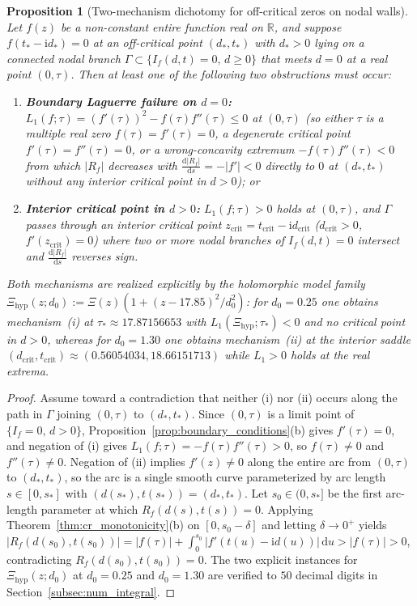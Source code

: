 \documentclass[11pt,a4paper,reqno]{amsart}
\newtheorem{proposition}[theorem]{Proposition}
\theoremstyle{definition}
\theoremstyle{remark}
\numberwithin{equation}{section}
\newcommand{\dd}{\mathrm{d}}
\newcommand{\ii}{\mathrm{i}}
\begin{document}
\begin{proposition}[Two-mechanism dichotomy for off-critical zeros on nodal walls]\label{prop:dichotomy}
Let $f(z)$ be a non-constant entire function real on $\mathbb{R}$, and suppose $f(t_* - \ii d_*) = 0$ at an off-critical point $(d_*, t_*)$ with $d_* > 0$ lying on a connected nodal branch $\Gamma \subset \{I_f(d,t) = 0,\, d \ge 0\}$ that meets $d = 0$ at a real point $(0,\tau)$. Then at least one of the following two obstructions must occur:
\begin{enumerate}
\item[\textup{(i)}] \textbf{Boundary Laguerre failure on $d = 0$:} $L_1(f;\tau) = (f'(\tau))^2 - f(\tau)f''(\tau) \le 0$ at $(0,\tau)$ (so either $\tau$ is a multiple real zero $f(\tau) = f'(\tau) = 0$, a degenerate critical point $f'(\tau) = f''(\tau) = 0$, or a wrong-concavity extremum $-f(\tau)f''(\tau) < 0$ from which $|R_f|$ decreases with $\frac{\dd|R_f|}{\dd s} = -|f'| < 0$ directly to $0$ at $(d_*,t_*)$ without any interior critical point in $d > 0$); or
\item[\textup{(ii)}] \textbf{Interior critical point in $d > 0$:} $L_1(f;\tau) > 0$ holds at $(0,\tau)$, and $\Gamma$ passes through an interior critical point $z_{\mathrm{crit}} = t_{\mathrm{crit}} - \ii d_{\mathrm{crit}}$ ($d_{\mathrm{crit}} > 0$, $f'(z_{\mathrm{crit}}) = 0$) where two or more nodal branches of $I_f(d,t) = 0$ intersect and $\frac{\dd|R_f|}{\dd s}$ reverses sign.
\end{enumerate}
Both mechanisms are realized explicitly by the holomorphic model family $\Xi_{\mathrm{hyp}}(z; d_0) := \Xi(z)(1 + (z - 17.85)^2/d_0^2)$: for $d_0 = 0.25$ one obtains mechanism~\textup{(i)} at $\tau_* \approx 17.87156653$ with $L_1(\Xi_{\mathrm{hyp}};\tau_*) < 0$ and no critical point in $d > 0$, whereas for $d_0 = 1.30$ one obtains mechanism~\textup{(ii)} at the interior saddle $(d_{\mathrm{crit}}, t_{\mathrm{crit}}) \approx (0.56054034, 18.66151713)$ while $L_1 > 0$ holds at the real extrema.
\end{proposition}

\begin{proof}
Assume toward a contradiction that neither (i) nor (ii) occurs along the path in $\Gamma$ joining $(0,\tau)$ to $(d_*,t_*)$. Since $(0,\tau)$ is a limit point of $\{I_f = 0,\, d > 0\}$, Proposition~\ref{prop:boundary_conditions}(b) gives $f'(\tau) = 0$, and negation of (i) gives $L_1(f;\tau) = -f(\tau)f''(\tau) > 0$, so $f(\tau) \neq 0$ and $f''(\tau) \neq 0$. Negation of (ii) implies $f'(z) \neq 0$ along the entire arc from $(0,\tau)$ to $(d_*,t_*)$, so the arc is a single smooth curve parameterized by arc length $s \in [0, s_*]$ with $(d(s_*), t(s_*)) = (d_*, t_*)$. Let $s_0 \in (0, s_*]$ be the first arc-length parameter at which $R_f(d(s), t(s)) = 0$. Applying Theorem~\ref{thm:cr_monotonicity}(b) on $[0, s_0 - \delta]$ and letting $\delta \to 0^+$ yields $|R_f(d(s_0), t(s_0))| = |f(\tau)| + \int_0^{s_0} |f'(t(u)-\ii d(u))|\,\dd u > |f(\tau)| > 0$, contradicting $R_f(d(s_0), t(s_0)) = 0$. The two explicit instances for $\Xi_{\mathrm{hyp}}(z; d_0)$ at $d_0 = 0.25$ and $d_0 = 1.30$ are verified to $50$ decimal digits in Section~\ref{subsec:num_integral}.
\end{proof}
\end{document}
